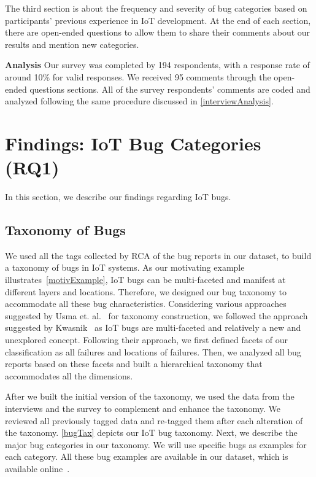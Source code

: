 The third section is about the frequency and severity of bug categories based on participants' previous experience in IoT development. At the end of each section, there are open-ended questions to allow them to share their comments about our results and mention new categories.

\textbf{Analysis}
Our survey was completed by 194 respondents, with a response rate of around 10\% for valid responses. 
 We received 95 comments through the open-ended questions sections. All of the survey respondents' comments are coded and analyzed following the same procedure discussed in \autoref{interviewAnalysis}.

\section{Findings: IoT Bug Categories (RQ1)}
In this section, we describe our findings regarding IoT bugs. 


\subsection{Taxonomy of Bugs}
We used all the tags collected by RCA of the bug reports in our dataset, to build a taxonomy of bugs in IoT systems. As our motivating example illustrates~\autoref{motivExample}, IoT bugs can be multi-faceted and manifest at different layers and locations. Therefore, we designed our bug taxonomy to accommodate all these bug characteristics. Considering various approaches suggested by Usma et. al.~\cite{usman2017taxonomies} for taxonomy construction, we followed the approach suggested by Kwasnik~\cite{kwasnik1999role} as IoT bugs are multi-faceted and relatively a new and unexplored concept. Following their approach, we first defined facets of our classification as all failures and locations of failures. Then, we analyzed all bug reports based on these facets and built a hierarchical taxonomy that accommodates all the dimensions.

After we built the initial version of the taxonomy, we used the data from the interviews and the survey to complement and enhance the taxonomy. We reviewed all previously tagged data and re-tagged them after each alteration of the taxonomy. \autoref{bugTax} depicts our IoT bug taxonomy. Next, we describe the major bug categories in our taxonomy. We will use specific bugs as examples for each category. All these bug examples are available in our dataset, which is available online~\cite{repPack}. 


